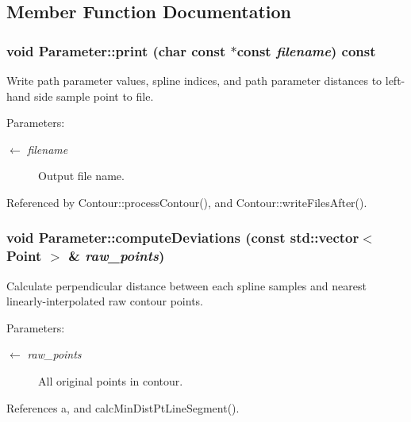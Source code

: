 \subsection{Member Function Documentation}
\hypertarget{classParameter_54d870873dcf44d515ab5384a38de7af}{
\subsubsection[print]{\setlength{\rightskip}{0pt plus 5cm}void Parameter::print (char const $\ast$const  {\em filename}) const}}
\label{classParameter_54d870873dcf44d515ab5384a38de7af}


Write path parameter values, spline indices, and path parameter distances to left-hand side sample point to file. \begin{Desc}
\item[Parameters:]
\begin{description}
\item[\mbox{$\leftarrow$} {\em filename}]Output file name. \end{description}
\end{Desc}


Referenced by Contour::processContour(), and Contour::writeFilesAfter().\hypertarget{classParameter_c3fd9360e62e3b9fe764a95e8f3e2b50}{
\subsubsection[computeDeviations]{\setlength{\rightskip}{0pt plus 5cm}void Parameter::computeDeviations (const std::vector$<$ {\bf Point} $>$ \& {\em raw\_\-points})}}
\label{classParameter_c3fd9360e62e3b9fe764a95e8f3e2b50}


Calculate perpendicular distance between each spline samples and nearest linearly-interpolated raw contour points. \begin{Desc}
\item[Parameters:]
\begin{description}
\item[\mbox{$\leftarrow$} {\em raw\_\-points}]All original points in contour. \end{description}
\end{Desc}


References a, and calcMinDistPtLineSegment().

